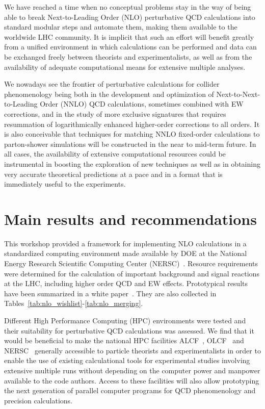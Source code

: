 We have reached a time when no conceptual problems stay in
the way of being able to break Next-to-Leading Order (NLO)
perturbative QCD calculations into standard modular steps and automate
them, making them available to the worldwide LHC community.  It is
implicit that such an effort will benefit greatly from a unified
environment in which calculations can be performed and data can be
exchanged freely between theorists and experimentalists,
as well as from the availability of adequate computational means
for extensive multiple analyses.

We nowadays see the frontier of perturbative
calculations for collider phenomenology being both in the
development and optimization of Next-to-Next-to-Leading Order (NNLO)
QCD calculations, sometimes combined with EW corrections, and in the
study of more exclusive signatures that requires resummation 
of logarithmically enhanced higher-order corrections to all orders.
It is also conceivable that techniques for matching NNLO fixed-order 
calculations to parton-shower simulations will be constructed in the 
near to mid-term future. In all cases, the availability 
of extensive computational resources could be instrumental
in boosting the exploration of new techniques as well as in
obtaining very accurate theoretical predictions at a pace and in a
format that is immediately useful to the experiments.

\section{Main results and recommendations}
This workshop provided a framework for implementing NLO calculations
in a standardized computing environment made available by DOE at the
National Energy Research Scientific Computing Center
(NERSC)~\cite{NERSC}.  Resource requirements were determined for the
calculation of important background and signal reactions at the
LHC, including higher order QCD and EW effects. Prototypical results 
have been summarized in a white paper~\cite{HPCWP}. They are also
collected in Tables~\ref{tab:nlo_wishlist}-\ref{tab:nlo_merging}.

Different High Performance Computing (HPC) environments were tested
and their suitability for perturbative QCD calculations was assessed.
We find that it would be beneficial to make the national HPC 
facilities ALCF~\cite{ALCF}, OLCF~\cite{OLCF} and NERSC~\cite{NERSC} 
generally accessible to particle theorists and
experimentalists in order to enable the use of existing
calculational tools for experimental studies involving extensive
multiple runs without depending on the computer power and manpower
available to the code authors. Access to these facilities will also
allow prototyping the next generation of parallel computer programs
for QCD phenomenology and precision calculations.


